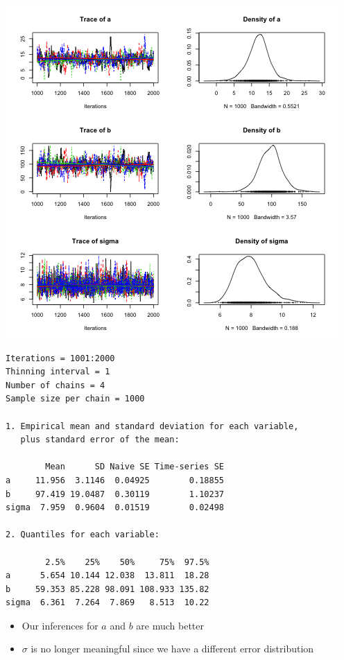 \documentclass{beamer}
\begin{document}
\begin{frame}[fragile]
  \begin{center}
    \includegraphics[scale = 0.4]{../graphs/lad/plot1.png}
  \end{center}
\end{frame}

\begin{frame}[fragile]
  \begin{verbatim}
Iterations = 1001:2000
Thinning interval = 1 
Number of chains = 4 
Sample size per chain = 1000 

1. Empirical mean and standard deviation for each variable,
   plus standard error of the mean:

        Mean      SD Naive SE Time-series SE
a     11.956  3.1146  0.04925        0.18855
b     97.419 19.0487  0.30119        1.10237
sigma  7.959  0.9604  0.01519        0.02498

2. Quantiles for each variable:

        2.5%    25%    50%     75%  97.5%
a      5.654 10.144 12.038  13.811  18.28
b     59.353 85.228 98.091 108.933 135.82
sigma  6.361  7.264  7.869   8.513  10.22
  \end{verbatim}
\end{frame}

\frame
{
  \begin{itemize}
    \item{Our inferences for $a$ and $b$ are much better}
    \item{$\sigma$ is no longer meaningful since we have a different error distribution}
  \end{itemize}
}
\end{document}
